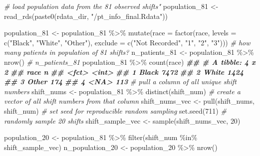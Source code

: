 \documentclass[
]{article}
\newenvironment{Shaded}{\begin{snugshade}}{\end{snugshade}}
\newcommand{\AttributeTok}[1]{\textcolor[rgb]{0.77,0.63,0.00}{#1}}
\newcommand{\CommentTok}[1]{\textcolor[rgb]{0.56,0.35,0.01}{\textit{#1}}}
\newcommand{\DecValTok}[1]{\textcolor[rgb]{0.00,0.00,0.81}{#1}}
\newcommand{\DocumentationTok}[1]{\textcolor[rgb]{0.56,0.35,0.01}{\textbf{\textit{#1}}}}
\newcommand{\FunctionTok}[1]{\textcolor[rgb]{0.00,0.00,0.00}{#1}}
\newcommand{\NormalTok}[1]{#1}
\newcommand{\OtherTok}[1]{\textcolor[rgb]{0.56,0.35,0.01}{#1}}
\newcommand{\SpecialCharTok}[1]{\textcolor[rgb]{0.00,0.00,0.00}{#1}}
\newcommand{\StringTok}[1]{\textcolor[rgb]{0.31,0.60,0.02}{#1}}
\begin{document}
\begin{Shaded}
\begin{Highlighting}[]
\CommentTok{\# load population data from the 81 observed shifts"}
\NormalTok{population\_81 }\OtherTok{\textless{}{-}} \FunctionTok{read\_rds}\NormalTok{(}\FunctionTok{paste0}\NormalTok{(rdata\_dir, }\StringTok{"/pt\_info\_final.Rdata"}\NormalTok{))}

\NormalTok{population\_81 }\OtherTok{\textless{}{-}}\NormalTok{ population\_81 }\SpecialCharTok{\%\textgreater{}\%} 
  \FunctionTok{mutate}\NormalTok{(}\AttributeTok{race =} \FunctionTok{factor}\NormalTok{(race,}
              \AttributeTok{levels =} \FunctionTok{c}\NormalTok{(}\StringTok{"Black"}\NormalTok{,}
                         \StringTok{"White"}\NormalTok{,}
                         \StringTok{"Other"}\NormalTok{),}
              \AttributeTok{exclude =} \FunctionTok{c}\NormalTok{(}\StringTok{"Not Recorded"}\NormalTok{, }\StringTok{"1"}\NormalTok{, }\StringTok{"2"}\NormalTok{, }\StringTok{"3"}\NormalTok{)))}
\CommentTok{\# how many patients in population of 81 shifts?}
\NormalTok{n\_patients\_81 }\OtherTok{\textless{}{-}}\NormalTok{ population\_81 }\SpecialCharTok{\%\textgreater{}\%}
  \FunctionTok{nrow}\NormalTok{()}
\CommentTok{\# n\_patients\_81}
\NormalTok{population\_81 }\SpecialCharTok{\%\textgreater{}\%} 
  \FunctionTok{count}\NormalTok{(race)}
\DocumentationTok{\#\# \# A tibble: 4 x 2}
\DocumentationTok{\#\#   race      n}
\DocumentationTok{\#\#   \textless{}fct\textgreater{} \textless{}int\textgreater{}}
\DocumentationTok{\#\# 1 Black  7472}
\DocumentationTok{\#\# 2 White  1424}
\DocumentationTok{\#\# 3 Other   174}
\DocumentationTok{\#\# 4 \textless{}NA\textgreater{}    113}
\CommentTok{\# pull a column of all unique shift numbers}
\NormalTok{shift\_nums }\OtherTok{\textless{}{-}}\NormalTok{ population\_81 }\SpecialCharTok{\%\textgreater{}\%} 
  \FunctionTok{distinct}\NormalTok{(shift\_num)}
\CommentTok{\# create a vector of all shift numbers from that column}
\NormalTok{shift\_nums\_vec }\OtherTok{\textless{}{-}} \FunctionTok{pull}\NormalTok{(shift\_nums, shift\_num)}
\CommentTok{\# set seed for reproducible random sampling}
\FunctionTok{set.seed}\NormalTok{(}\DecValTok{711}\NormalTok{)}
\CommentTok{\# randomly sample 20 shifts}
\NormalTok{shift\_sample\_vec }\OtherTok{\textless{}{-}} \FunctionTok{sample}\NormalTok{(shift\_nums\_vec, }\DecValTok{20}\NormalTok{)}

\NormalTok{population\_20 }\OtherTok{\textless{}{-}}\NormalTok{ population\_81 }\SpecialCharTok{\%\textgreater{}\%} 
  \FunctionTok{filter}\NormalTok{(shift\_num }\SpecialCharTok{\%in\%}\NormalTok{ shift\_sample\_vec) }
\NormalTok{n\_population\_20 }\OtherTok{\textless{}{-}}\NormalTok{ population\_20 }\SpecialCharTok{\%\textgreater{}\%} 
  \FunctionTok{nrow}\NormalTok{()}
\end{Highlighting}
\end{Shaded}
\end{document}
